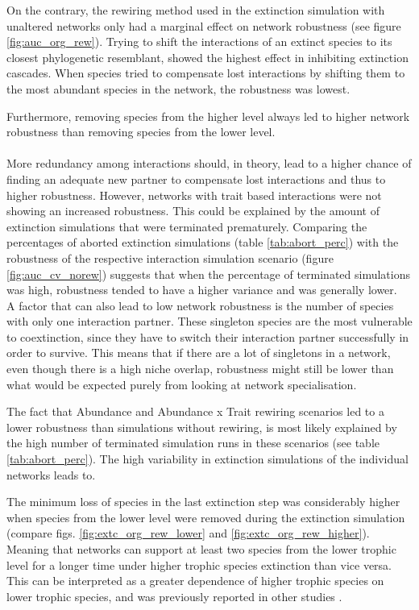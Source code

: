 \documentclass[12pt,a4paper]{article}
\begin{document}
On the contrary, the rewiring method used in the extinction simulation with unaltered networks only had a marginal effect on network robustness (see figure \ref{fig:auc_org_rew}). Trying to shift the interactions of an extinct species to its closest phylogenetic resemblant, showed the highest effect in inhibiting extinction cascades. When species tried to compensate lost interactions by shifting them to the most abundant species in the network, the robustness was lowest.

Furthermore, removing species from the higher level always led to higher network robustness than removing species from the lower level.
\paragraph{}

More redundancy among interactions should, in theory, lead to a higher chance of finding an adequate new partner to compensate lost interactions and thus to higher robustness. However, networks with trait based interactions were not showing an increased robustness. This could be explained by the amount of extinction simulations that were terminated prematurely. Comparing the percentages of aborted extinction simulations (table \ref{tab:abort_perc}) with the robustness of the respective interaction simulation scenario (figure \ref{fig:auc_cv_norew}) suggests that when the percentage of terminated simulations was high, robustness tended to have a higher variance and was generally lower.\\ A factor that can also lead to low network robustness is the number of species with only one interaction partner. These singleton species are the most vulnerable to coextinction, since they have to switch their interaction partner successfully in order to survive. This means that if there are a lot of singletons in a network, even though there is a high niche overlap, robustness might still be lower than what would be expected purely from looking at network specialisation.

The fact that Abundance and Abundance x Trait rewiring scenarios led to a lower robustness than simulations without rewiring, is most likely explained by the high number of terminated simulation runs in these scenarios (see table \ref{tab:abort_perc}). The high variability in extinction simulations of the individual networks leads to.

The minimum loss of species in the last extinction step was considerably higher when species from the lower level were removed during the extinction simulation (compare figs. \ref{fig:extc_org_rew_lower} and \ref{fig:extc_org_rew_higher}). 
Meaning that networks can support at least two species from the lower trophic level for a longer time under higher trophic species extinction than vice versa. This can be interpreted as a greater dependence of higher trophic species on lower trophic species, and was previously reported in other studies \parencite{Bascompte2006, Schleuning2016}.
\end{document}
